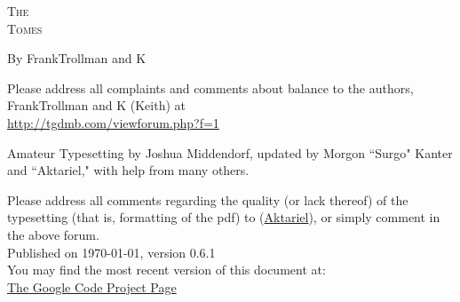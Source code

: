 \pagestyle{plain}

\begin{center} \Huge

\textsc{The\\
Tomes\\
}\end{center}



\vspace{2cm}
\begin{center}\large By FrankTrollman and K\end{center}


\newpage

\vspace*{4in}

\noindent Please address all complaints and comments about balance to the authors, FrankTrollman and K (Keith) at\\
{\color{blue} \href{http://tgdmb.com/viewforum.php?f=1}{http://tgdmb.com/viewforum.php?f=1}}

\vspace{0.2in}



\noindent Amateur Typesetting by Joshua Middendorf, updated by Morgon ``Surgo" Kanter and ``Aktariel," with help from many others.\\

\vspace{0.15in}

\noindent Please address all comments regarding the quality (or lack thereof) of the typesetting (that is, formatting of the pdf) to (\href{mailto:aktariel@gmail.com}{Aktariel}), or simply comment in the above forum.\\





\vspace{1in}
\noindent Published on \today, version 0.6.1\\
\noindent You may find the most recent version of this document at:\\
{\color{blue} \href{http://code.google.com/p/awesometome/downloads/list}{The Google Code Project Page}}

\newpage
